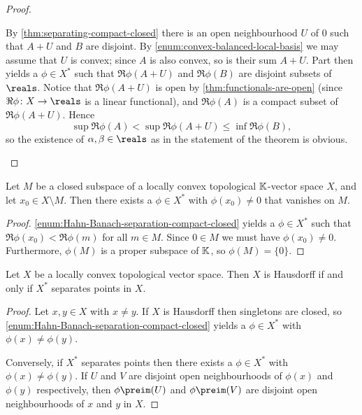 \documentclass[article, a4paper, 11pt, oneside]{memoir}
\numberwithin{equation}{chapter}
\begin{document}
\begin{proof}
\begin{proofsec}
    \item[Proof of \subcref{enum:Hahn-Banach-separation-compact-closed}]
    By \cref{thm:separating-compact-closed} there is an open neighbourhood $U$ of $0$ such that $A + U$ and $B$ are disjoint. By \cref{enum:convex-balanced-local-basis} we may assume that $U$ is convex; since $A$ is also convex, so is their sum $A + U$. Part  then yields a $\phi \in X^*$ such that $\Re\phi(A+U)$ and $\Re\phi(B)$ are disjoint subsets of $\reals$. Notice that $\Re\phi(A+U)$ is open by \cref{thm:functionals-are-open} (since $\Re\phi \colon X \to \reals$ is a linear functional), and $\Re\phi(A)$ is a compact subset of $\Re\phi(A+U)$. Hence
    \begin{equation*}
        \sup \Re\phi(A)
            < \sup \Re\phi(A+U)
            \leq \inf \Re\phi(B),
    \end{equation*}
    so the existence of $\alpha, \beta \in \reals$ as in the statement of the theorem is obvious.
\end{proofsec}
\end{proof}


\begin{corollary}
    Let $M$ be a closed subspace of a locally convex topological $\mathbb{K}$-vector space $X$, and let $x_0 \in X \setminus M$. Then there exists a $\phi \in X^*$ with $\phi(x_0) \neq 0$ that vanishes on $M$.
\end{corollary}

\begin{proof}
    \cref{enum:Hahn-Banach-separation-compact-closed} yields a $\phi \in X^*$ such that $\Re \phi(x_0) < \Re \phi(m)$ for all $m \in M$. Since $0 \in M$ we must have $\phi(x_0) \neq 0$. Furthermore, $\phi(M)$ is a proper subspace of $\mathbb{K}$, so $\phi(M) = \{0\}$.
\end{proof}

\begin{corollary}
    \label{thm:X*-separating-points-Hausdorff}
    Let $X$ be a locally convex topological vector space. Then $X$ is Hausdorff if and only if $X^*$ separates points in $X$.
\end{corollary}

\begin{proof}
    Let $x,y \in X$ with $x \neq y$. If $X$ is Hausdorff then singletons are closed, so \cref{enum:Hahn-Banach-separation-compact-closed} yields a $\phi \in X^*$ with $\phi(x) \neq \phi(y)$.

    Conversely, if $X^*$ separates points then there exists a $\phi \in X^*$ with $\phi(x) \neq \phi(y)$. If $U$ and $V$ are disjoint open neighbourhoods of $\phi(x)$ and $\phi(y)$ respectively, then $\phi\preim(U)$ and $\phi\preim(V)$ are disjoint open neighbourhoods of $x$ and $y$ in $X$.
\end{proof}
\end{document}
